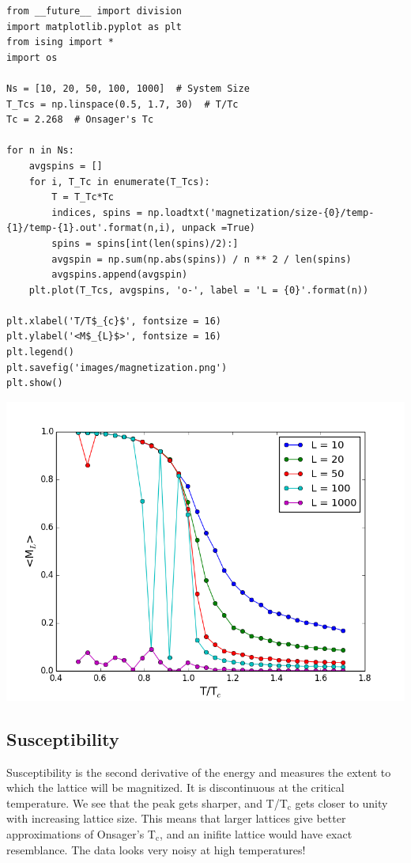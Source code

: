 \documentclass{article}
\begin{document}
\begin{verbatim}
from __future__ import division
import matplotlib.pyplot as plt
from ising import *
import os

Ns = [10, 20, 50, 100, 1000]  # System Size
T_Tcs = np.linspace(0.5, 1.7, 30)  # T/Tc
Tc = 2.268  # Onsager's Tc

for n in Ns:
    avgspins = []
    for i, T_Tc in enumerate(T_Tcs):
        T = T_Tc*Tc
        indices, spins = np.loadtxt('magnetization/size-{0}/temp-{1}/temp-{1}.out'.format(n,i), unpack =True)
        spins = spins[int(len(spins)/2):]
        avgspin = np.sum(np.abs(spins)) / n ** 2 / len(spins)
        avgspins.append(avgspin)
    plt.plot(T_Tcs, avgspins, 'o-', label = 'L = {0}'.format(n))

plt.xlabel('T/T$_{c}$', fontsize = 16)
plt.ylabel('<M$_{L}$>', fontsize = 16)
plt.legend()
plt.savefig('images/magnetization.png')
plt.show()
\end{verbatim}

\includegraphics[width=.9\linewidth]{./images/magnetization.png}

\subsection{Susceptibility}
\label{sec-5-3}

Susceptibility is the second derivative of the energy and measures the extent to which the lattice will be magnitized. It is discontinuous at the critical temperature. We see that the peak gets sharper, and T/T$_{\text{c}}$ gets closer to unity with increasing lattice size. This means that larger lattices give better approximations of Onsager's T$_{\text{c}}$, and an inifite lattice would have exact resemblance. The data looks very noisy at high temperatures!
\end{document}
